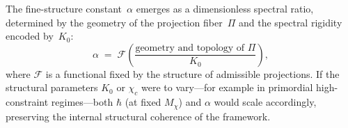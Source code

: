     The fine-structure constant~$\alpha$ emerges as a dimensionless spectral
    ratio, determined by the geometry of the projection fiber~$\Pi$ and the
    spectral rigidity encoded by~$K_0$:
    \begin{equation}
      \alpha \;=\;
      \mathcal{F}\!\left(
                     \frac{\text{geometry and topology of }\Pi}{K_0}
      \right),
      \label{eq:alpha-functional}
    \end{equation}
    where $\mathcal{F}$ is a functional fixed by the structure of admissible
    projections.
    If the structural parameters $K_0$ or $\chi_c$ were to vary---for example
    in primordial high-constraint regimes---both $\hbar$ (at fixed $M_\chi$) and $\alpha$ would
    scale accordingly, preserving the internal structural coherence of the
    framework.

